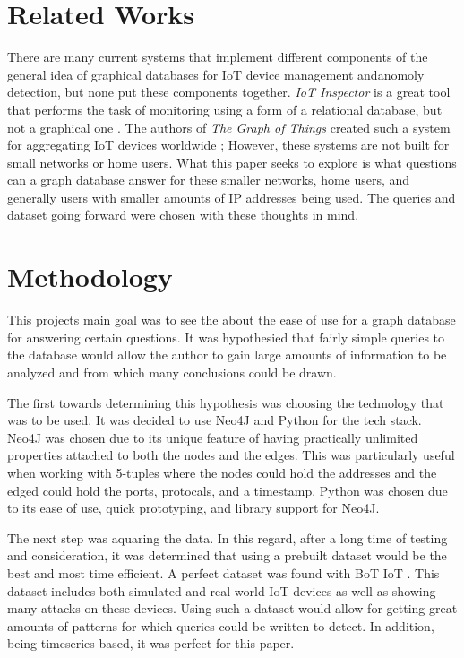 \documentclass[conference]{IEEEtran}
\begin{document}
\section{Related Works}
There are many current systems that implement different components of the general idea of graphical databases for
IoT device management andanomoly detection, but none put these components together. \textit{IoT Inspector} is a great
tool that performs the task of monitoring using a form of a relational database, but not a graphical one \cite{IoTInspector}.
The authors of \textit{The Graph of Things} created such a system for aggregating IoT devices worldwide \cite{GraphofThings}; 
However, these systems are not built for small networks or home users. What this paper seeks to explore is what questions
can a graph database answer for these smaller networks, home users, and generally users with smaller amounts of
IP addresses being used. The queries and dataset going forward were chosen with these thoughts in mind.
 
\section{Methodology}
This projects main goal was to see the about the ease of use for a graph database for answering certain questions.
It was hypothesied that fairly simple queries to the database would allow the author to gain large amounts of
information to be analyzed and from which many conclusions could be drawn.

The first towards determining this hypothesis was choosing the technology that was to be used. It was decided 
to use Neo4J and Python for the tech stack. Neo4J was chosen due to its unique feature of having practically 
unlimited properties attached to both the nodes and the edges. This was particularly useful when working with 
5-tuples where the nodes could hold the addresses and the edged could hold the ports, protocals, and a timestamp.
Python was chosen due to its ease of use, quick prototyping, and library support for Neo4J. 

The next step was aquaring the data. In this regard, after a long time of testing and consideration, it was
determined that using a prebuilt dataset would be the best and most time efficient. A perfect dataset was
found with BoT IoT \cite{BoTIoT}. This dataset includes both simulated and real world IoT devices as well
as showing many attacks on these devices. Using such a dataset would allow for getting great amounts of
patterns for which queries could be written to detect. In addition, being timeseries based, it was perfect
for this paper.
\end{document}
